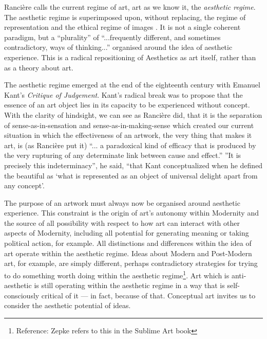 \documentclass[letterpaper]{article}
\begin{document}
    Rancière calls the current regime of art, art as we know it, the \emph{aesthetic regime}. The aesthetic regime is superimposed upon, without replacing, the regime of representation and the ethical regime of images \citep[p.50]{RancierPltcsOfThAsthtcs2004}. It is not a single coherent paradigm, but a “plurality” of “...frequently different, and sometimes contradictory, ways of thinking...” \citep[p.8]{RanciereMdrnTms2022} organised around the idea of aesthetic experience. This is a radical repositioning of Aesthetics as art itself, rather than as a theory about art.
    
    The aesthetic regime emerged at the end of the eighteenth century with Emanuel Kant's \emph{Critique of Judgement}. Kant's radical break was to propose that the essence of an art object lies in its capacity to be experienced without concept. With the clarity of hindsight, we can see as Rancière did, that it is the separation of sense-as-in-sensation and sense-as-in-making-sense which created our current situation in which the effectiveness of an artwork, the very thing that makes it art, is (as Rancière put it) “... a paradoxical kind of efficacy that is produced by the very rupturing of any determinate link between cause and effect.” \citep[p.51]{RancierThEmncptdSpcttr2009} ”It is precisely this indeterminacy”, he said, “that Kant conceptualized when he defined the beautiful as ‘what is represented as an object of universal delight apart from any concept’. \citep[p.52]{RancierThEmncptdSpcttr2009}

    The purpose of an artwork must always now be organised around aesthetic experience. This constraint is the origin of art's autonomy within Modernity and the source of all possibility with respect to how art can interact with other aspects of Modernity, including all potential for generating meaning or taking political action, for example. All distinctions and differences within the idea of art operate within the aesthetic regime. Ideas about Modern and Post-Modern art, for example, are simply different, perhaps contradictory strategies for trying to do something worth doing within the aesthetic regime\footnote{Reference: Zepke refers to this in the Sublime Art book}. Art which is anti-aesthetic is still operating within the aesthetic regime in a way that is self-consciously critical of it — in fact, because of that. Conceptual art invites us to consider the aesthetic potential of ideas.
\end{document}
